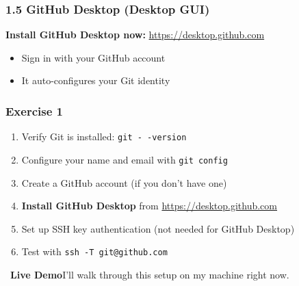 \documentclass{beamer}
\newcommand{\livedemo}[1]{\begin{alertblock}{\faDesktop\ \textbf{Live Demo}}#1\end{alertblock}}
\begin{document}
\begin{frame}
\frametitle{1.5 GitHub Desktop (Desktop GUI)}

\vspace{4mm}
\textbf{Install GitHub Desktop now:} \url{https://desktop.github.com}
\begin{itemize}
    \item Sign in with your GitHub account
    \item It auto-configures your Git identity
\end{itemize}
\end{frame}


\begin{frame}
\frametitle{Exercise 1}
\begin{enumerate}
    \item Verify Git is installed: \texttt{git - -version}
    \item Configure your name and email with \texttt{git config}
    \item Create a GitHub account (if you don't have one)
    \item \textbf{Install GitHub Desktop} from \url{https://desktop.github.com}
    \item Set up SSH key authentication (not needed for GitHub Desktop)
    \item Test with \texttt{ssh -T git@github.com}
\end{enumerate}
\livedemo{I'll walk through this setup on my machine right now.}
\end{frame}


\end{document}
